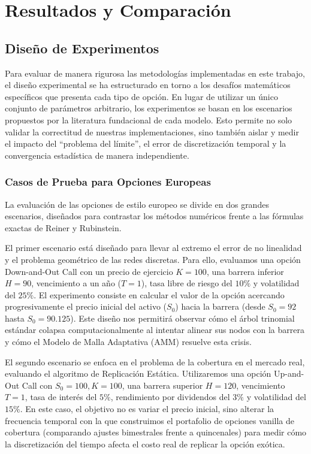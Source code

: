 \chapter{Resultados y Comparación}
\label{chapter:resultados}

\section{Diseño de Experimentos}
\label{sec:diseno_experimentos}

Para evaluar de manera rigurosa las metodologías implementadas en este trabajo, el diseño experimental se ha estructurado en torno a los desafíos matemáticos específicos que presenta cada tipo de opción. En lugar de utilizar un único conjunto de parámetros arbitrario, los experimentos se basan en los escenarios propuestos por la literatura fundacional de cada modelo. Esto permite no solo validar la correctitud de nuestras implementaciones, sino también aislar y medir el impacto del ``problema del límite'', el error de discretización temporal y la convergencia estadística de manera independiente.

\subsection{Casos de Prueba para Opciones Europeas}

La evaluación de las opciones de estilo europeo se divide en dos grandes escenarios, diseñados para contrastar los métodos numéricos frente a las fórmulas exactas de Reiner y Rubinstein.

El primer escenario está diseñado para llevar al extremo el error de no linealidad y el problema geométrico de las redes discretas. Para ello, evaluamos una opción Down-and-Out Call con un precio de ejercicio $K=100$, una barrera inferior $H=90$, vencimiento a un año ($T=1$), tasa libre de riesgo del $10\%$ y volatilidad del $25\%$. El experimento consiste en calcular el valor de la opción acercando progresivamente el precio inicial del activo ($S_0$) hacia la barrera (desde $S_0=92$ hasta $S_0=90.125$). Este diseño nos permitirá observar cómo el árbol trinomial estándar colapsa computacionalmente al intentar alinear sus nodos con la barrera y cómo el Modelo de Malla Adaptativa (AMM) resuelve esta crisis.

El segundo escenario se enfoca en el problema de la cobertura en el mercado real, evaluando el algoritmo de Replicación Estática. Utilizaremos una opción Up-and-Out Call con $S_0=100, K=100$, una barrera superior $H=120$, vencimiento $T=1$, tasa de interés del $5\%$, rendimiento por dividendos del $3\%$ y volatilidad del $15\%$. En este caso, el objetivo no es variar el precio inicial, sino alterar la frecuencia temporal con la que construimos el portafolio de opciones vanilla de cobertura (comparando ajustes bimestrales frente a quincenales) para medir cómo la discretización del tiempo afecta el costo real de replicar la opción exótica.

